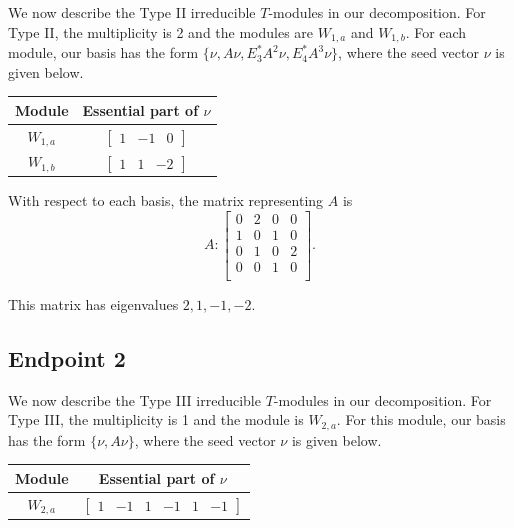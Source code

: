\documentclass[12pt,letterpaper]{article}
\newcommand{\rowvector}[1]{\begin{bmatrix} #1 \end{bmatrix}}
\begin{document}
We now describe the Type II irreducible $T$-modules in our decomposition. For Type II, the multiplicity is 2 and the modules are $W_{1,a}$ and $W_{1,b}$. For each module, our basis has the form $\{\nu, A\nu, E_3^*A^2\nu, E_4^*A^3\nu\}$, where the seed vector $\nu$ is given below.
\begin{center}
    \begin{tabular}{c | c}
    \toprule
       \textbf{Module}  & \textbf {Essential part of }$\nu$ \\
       \midrule
       $W_{1,a}$  & $\rowvector{1 & -1 & 0}$ \\[1.67pt]
       $W_{1,b}$  & $\rowvector{1 & 1 & -2}$ \\
    \bottomrule
    \end{tabular}
\end{center}

With respect to each basis, the matrix representing $A$ is 
\begin{equation}
    A: \begin{bmatrix}
  0 & 2 & 0 & 0 \\
  1 & 0 & 1 & 0 \\
  0 & 1 & 0 & 2 \\
  0 & 0 & 1 & 0 \\
\end{bmatrix}.
\label{eq:des-II}
\end{equation}

This matrix has eigenvalues $2, 1, -1, -2$.

\subsection{Endpoint 2}

We now describe the Type III irreducible $T$-modules in our decomposition. For Type III, the multiplicity is 1 and the module is  $W_{2,a}$. For this module, our basis has the form $\{\nu, A\nu\}$, where the seed vector $\nu$ is given below.
\begin{center}
    \begin{tabular}{c | c}
    \toprule
       \textbf{Module}  & \textbf {Essential part of }$\nu$ \\
       \midrule
       $W_{2,a}$  & $\rowvector{1 & -1 & 1 & -1 & 1 & -1}$ \\
    \bottomrule
    \end{tabular}
\end{center}
\end{document}
